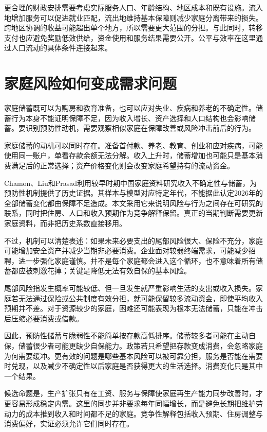 \documentclass[UTF8,fontset=fandol,zihao=-4,oneside,openany]{ctexbook}
\begin{document}
更合理的财政安排需要考虑实际服务人口、年龄结构、地区成本和既有设施。流入地增加服务可以促进就业匹配，流出地维持基本保障则减少家庭分离带来的损失。跨地区协调的收益可能超出单个地方，所以需要更大范围的分担。与此同时，转移支付也应避免奖励低效供给，资金使用和服务结果需要公开。公平与效率在这里通过人口流动的具体条件连接起来。

\section{家庭风险如何变成需求问题}
家庭储蓄既可以为购房和教育准备，也可以应对失业、疾病和养老的不确定性。储蓄行为本身不能证明保障不足，因为收入增长、资产选择和人口结构也会影响储蓄。要识别预防性动机，需要观察相似家庭在保障改善或风险冲击前后的行为。

\label{arg:P150}
家庭储蓄的动机可以同时存在。准备首付款、养老、教育、创业和应对疾病，可能使用同一账户，单看存款余额无法分解。收入上升时，储蓄增加也可能只是基本消费满足后的正常选择；资产价格变化则会改变家庭希望持有的流动资金。

Chamon、Liu和Prasad利用较早时期中国家庭资料研究收入不确定性与储蓄，为预防性机制提供了历史证据。其样本与模型对应特定年代，不能据此认定2026年的全部储蓄变化都由保障不足造成。本文采用它来说明风险与行为之间存在可研究的联系，同时把住房、人口和收入预期作为竞争解释保留。真正的当期判断需要更新家庭资料，而非把历史系数直接移用。\cite{Chamon2010}

不过，机制可以清楚表述：如果未来必要支出的尾部风险很大、保险不充分，家庭可能增加安全资产并减少当期非必要消费。企业面对较弱终端需求，可能减少招聘，进一步强化家庭谨慎。并不是每个家庭都会进入这个循环，也不意味着所有储蓄都应被刺激花掉；关键是降低无法有效自保的基本风险。

\label{arg:P151}
尾部风险指发生概率可能较低、但一旦发生就严重影响生活的支出或收入损失。家庭若无法通过保险或公共制度有效分担，就可能保留较多流动资金，即使平均收入预期并不差。对于资源较少的家庭，困难还可能表现为根本无法储蓄，只能在冲击后压缩必要消费或借款。

因此，预防性储蓄与脆弱性不能简单按存款高低排序。储蓄较多者可能在主动自保，储蓄很少者可能更缺少自保能力。政策若只希望把存款变成消费，会忽略家庭为何需要缓冲。更有效的问题是哪些基本风险可以被可靠分担，服务是否能在需要时兑现，以及减少不确定性以后家庭是否获得更大的生活选择。消费变化只是其中一个结果。

候选命题是，生产扩张只有在工资、服务与保障使家庭再生产能力同步改善时，才更容易形成稳定内需。这里的同步并非要求每年同幅增长，而是避免长期把维护劳动力的成本推到收入和时间都不足的家庭。竞争性解释包括收入预期、住房调整与消费偏好，实证必须允许它们同时存在。
\end{document}
